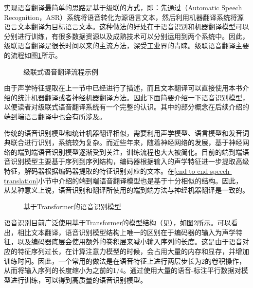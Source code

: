 \parinterval 实现语音翻译最简单的思路是基于级联的方式，即：先通过{\small{}}（Automatic Speech Recognition，ASR）系统将语音转化为源语言文本，然后利用机器翻译系统将源语言文本翻译为目标语言文本。这种做法的好处在于语音识别和机器翻译模型可以分别进行训练，有很多数据资源以及成熟技术可以分别运用到两个系统中。因此，级联语音翻译是很长时间以来的主流方法，深受工业界的青睐。级联语音翻译主要的流程如图\ref{fig:17-4}所示。

\begin{figure}[htp]
\centering

\caption{级联式语音翻译流程示例}
\label{fig:17-4}
\end{figure}

\parinterval 由于声学特征提取在上一节中已经进行了描述，而且文本翻译可以直接使用本书介绍的统计机器翻译或者神经机器翻译方法。因此下面简要介绍一下语音识别模型，以便读者对级联式语音翻译系统有一个完整的认识。其中的部分概念在后续介绍的端到端语言翻译中也会有所涉及。

\parinterval 传统的语音识别模型和统计机器翻译相似，需要利用声学模型、语言模型和发音词典联合进行识别，系统较为复杂。而近些年来，随着神经网络的发展，基于神经网络的端到端语音识别模型逐渐受到关注，训练流程也大大被简化。目前的端到端语音识别模型主要基于序列到序列结构，编码器根据输入的声学特征进一步提取高级特征，解码器根据编码器提取的特征识别对应的文本。在\ref{end-to-end-speech-translation}小节中介绍的端到端语音翻译模型也是基于十分相似的结构。因此，从某种意义上说，语音识别和翻译所使用的端到端方法与神经机器翻译是一致的。
\begin{figure}[htp]
\centering

\setlength{\abovecaptionskip}{-0.2em}
\caption{基于Transformer的语音识别模型}
\label{fig:17-5}
\end{figure}

\vspace{-1em}
\parinterval 语音识别目前广泛使用基于Transformer的模型结构（见{\chaptertwelve}），如图\ref{fig:17-5}所示。可以看出，相比文本翻译，语音识别模型结构上唯一的区别在于编码器的输入为声学特征，以及编码器底层会使用额外的卷积层来减小输入序列的长度。这是由于语音对应的特征序列过长，在计算注意力模型的时候，会占用大量的内存和显存，并增加训练时间。因此，一个常用的做法是在语音特征上进行两层步长为2的卷积操作，从而将输入序列的长度缩小为之前的1/4。通过使用大量的语音-标注平行数据对模型进行训练，可以得到高质量的语音识别模型。

